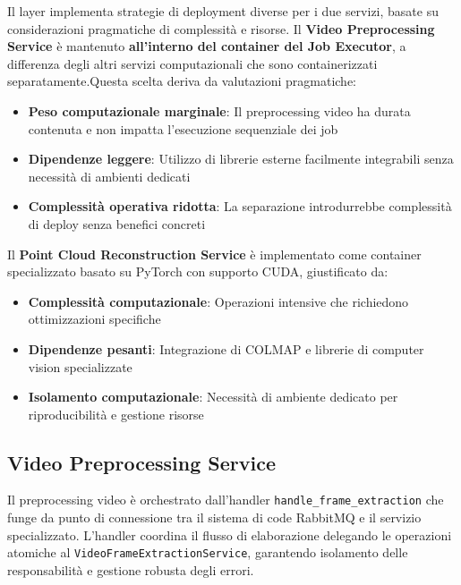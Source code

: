 Il layer implementa strategie di deployment diverse per i due servizi, basate su considerazioni pragmatiche di complessità e risorse.
\newline
\newline
Il \textbf{Video Preprocessing Service} è mantenuto \textbf{all'interno del container del Job Executor}, a differenza degli altri servizi computazionali che sono containerizzati separatamente.\newpage Questa scelta deriva da valutazioni pragmatiche:

\begin{itemize}
	\item \textbf{Peso computazionale marginale}: Il preprocessing video ha durata contenuta e non impatta l'esecuzione sequenziale dei job
	\item \textbf{Dipendenze leggere}: Utilizzo di librerie esterne facilmente integrabili senza necessità di ambienti dedicati
	\item \textbf{Complessità operativa ridotta}: La separazione introdurrebbe complessità di deploy senza benefici concreti
\end{itemize}

Il \textbf{Point Cloud Reconstruction Service} è implementato come container specializzato basato su PyTorch con supporto CUDA, giustificato da:

\begin{itemize}
	\item \textbf{Complessità computazionale}: Operazioni intensive che richiedono ottimizzazioni specifiche
	\item \textbf{Dipendenze pesanti}: Integrazione di COLMAP e librerie di computer vision specializzate
	\item \textbf{Isolamento computazionale}: Necessità di ambiente dedicato per riproducibilità e gestione risorse
\end{itemize}

\subsection{Video Preprocessing Service}

Il preprocessing video è orchestrato dall'handler \texttt{handle\_frame\_extraction} che funge da punto di connessione tra il sistema di code RabbitMQ e il servizio specializzato. L'handler coordina il flusso di elaborazione delegando le operazioni atomiche al \texttt{VideoFrameExtractionService}, garantendo isolamento delle responsabilità e gestione robusta degli errori.

